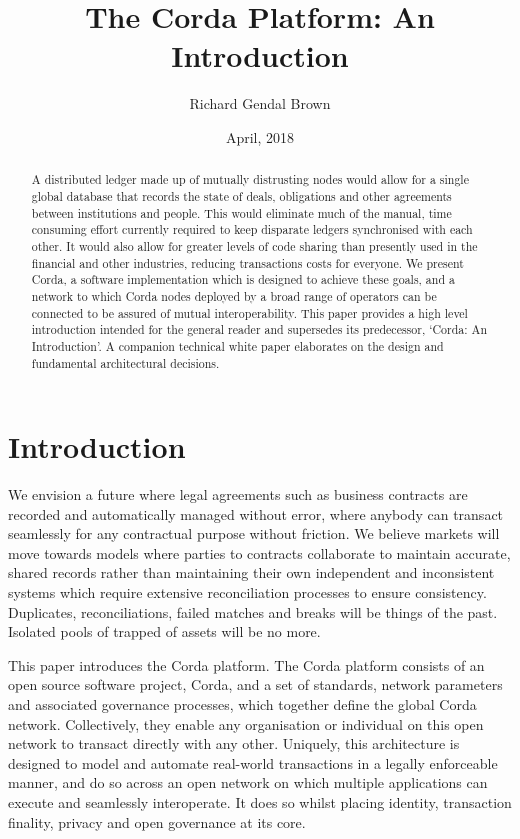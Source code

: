 \documentclass{article}
\author{Richard Gendal Brown}
\date{April, 2018}
\title{The Corda Platform: An Introduction}
\begin{document}
\maketitle 

\begin{abstract}

A distributed ledger made up of mutually distrusting nodes would allow for a single global database that records the state of deals, obligations and other agreements between institutions and people. This would eliminate much of the manual, time consuming effort currently required to keep disparate ledgers synchronised with each other. It would also allow for greater levels of code sharing than presently used in the financial and other industries, reducing transactions costs for everyone. We present Corda, a software implementation which is designed to achieve these goals, and a network to which Corda nodes deployed by a broad range of operators can be connected to be assured of mutual interoperability. This paper provides a high level introduction intended for the general reader and supersedes its predecessor, `Corda: An Introduction'\cite{CordaIntro}. A companion technical white paper\cite{CordaTech} elaborates on the design and fundamental architectural decisions.
\end{abstract}
\newpage
\tableofcontents
\newpage
\section{Introduction}
We envision a future where legal agreements such as business contracts are recorded and automatically managed without error, where anybody can transact seamlessly for any contractual purpose without friction. We believe markets will move towards models where parties to contracts collaborate to maintain accurate, shared records rather than maintaining their own independent and inconsistent systems which require extensive reconciliation processes to ensure consistency. Duplicates, reconciliations, failed matches and breaks will be things of the past. Isolated pools of trapped of assets will be no more.

This paper introduces the Corda platform. The Corda platform consists of an open source software project, Corda, and a set of standards, network parameters and associated governance processes, which together define the global Corda network. Collectively, they enable any organisation or individual on this open network to transact directly with any other. Uniquely, this architecture is designed to model and automate real-world transactions in a legally enforceable manner, and do so across an open network on which multiple applications can execute and seamlessly interoperate. It does so whilst placing identity, transaction finality, privacy and open governance at its core.
\end{document}
